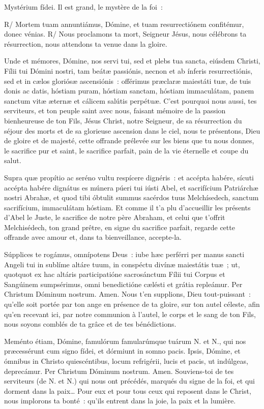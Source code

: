 \begin{paracol}{2}
\LigneParacol
{Mystérium fídei.}
{Il est grand, le mystère de la foi~:}

\LigneParacol
{R/ Mortem tuam annuntiámus, Dómine, et tuam resurrectiónem confitémur, donec vénias.}
{R/ Nous proclamons ta mort, Seigneur Jésus, nous célébrons ta résurrection, nous attendons ta venue dans la gloire.}

\LigneParacol
{Unde et mémores, Dómine, nos servi tui, sed et plebs tua sancta, eiúsdem Christi, Fílii tui Dómini nostri, tam beátæ passiónis, necnon et ab ínferis resurrectiónis, sed et in cælos gloriósæ ascensiónis~: offérimus præclaræ maiestáti tuæ, de tuis donis ac datis, hóstiam puram, hóstiam sanctam, hóstiam immaculátam, panem sanctum vitæ æternæ et cálicem salútis perpétuæ.}
{C'est pourquoi nous aussi, tes serviteurs, et ton peuple saint avec nous, faisant mémoire de la passion bienheureuse de ton Fils, Jésus Christ, notre Seigneur, de sa résurrection du séjour des morts et de sa glorieuse ascension dans le ciel, nous te présentons, Dieu de gloire et de majesté, cette offrande prélevée sur les biens que tu nous donnes, le sacrifice pur et saint, le sacrifice parfait, pain de la vie éternelle et coupe du salut.}

\LigneParacol
{Supra quæ propítio ac seréno vultu respícere dignéris~: et accépta habére, sícuti accépta habére dignátus es múnera púeri tui iústi Abel, et sacrifícium Patriárchæ nostri Abrahæ, et quod tibi óbtulit summus sacérdos tuus Melchísedech, sanctum sacrifícium, immaculátam hóstiam.}
{Et comme il t'a plu d'accueillir les présents d'Abel le Juste, le sacrifice de notre père Abraham, et celui que t'offrit Melchisédech, ton grand prêtre, en signe du sacrifice parfait, regarde cette offrande avec amour et, dans ta bienveillance, accepte-la.}

\LigneParacol
{Súpplices te rogámus, omnípotens De\-us~: iube hæc perférri per manus sancti Angeli tui in sublíme altáre tuum, in conspéctu divínæ maiestátis tuæ~; ut, quotquot ex hac altáris participatióne sacrosánctum Fílii tui Corpus et Sangúinem sumpsérimus, omni benedictióne cælésti et grátia repleámur. Per Christum Dóminum nostrum. Amen.}
{Nous t'en supplions, Dieu tout-puis\-sant~: qu'elle soit portée par ton ange en présence de ta gloire, sur ton autel céleste, afin qu'en recevant ici, par notre communion à l'autel, le corps et le sang de ton Fils, nous soyons comblés de ta grâce et de tes bénédictions.}

\LigneParacol
{Meménto étiam, Dómine, famulórum famularúmque tuárum {\color{rougeliturgique}N.} et {\color{rougeliturgique}N.}, qui nos præcessérunt cum signo fídei, et dórmiunt in somno pacis. Ipsis, Dómine, et ómnibus in Christo quiescéntibus, locum refrigérii, lucis et pacis, ut indúlgeas, deprecámur. Per Christum Dóminum nostrum. Amen.}
{Souviens-toi de tes serviteurs (de {\color{rougeliturgique}N.} et {\color{rougeliturgique}N.}) qui nous ont précédés, marqués du signe de la foi, et qui dorment dans la paix… Pour eux et pour tous ceux qui reposent dans le Christ, nous implorons ta bonté~: qu'ils entrent dans la joie, la paix et la lumière.}


\end{paracol}
